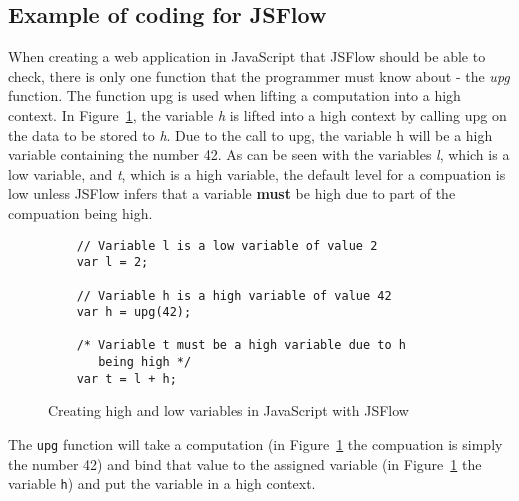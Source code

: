 \subsection{Example of coding for JSFlow}
When creating a web application in JavaScript that JSFlow should be able to check, there is only one function that the programmer must know about - the \emph{upg} function. The function upg is used when lifting a computation into a high context. In Figure~\ref{fig:upg}, the variable \emph{h} is lifted into a high context by calling upg on the data to be stored to \emph{h}. Due to the call to upg, the variable h will be a high variable containing the number 42. As can be seen with the variables \emph{l}, which is a low variable, and \emph{t}, which is a high variable, the default level for a compuation is low unless JSFlow infers that a variable \textbf{must} be high due to part of the compuation being high.

\begin{figure}[h]
  \begin{verbatim}
    // Variable l is a low variable of value 2
    var l = 2;

    // Variable h is a high variable of value 42
    var h = upg(42);

    /* Variable t must be a high variable due to h
       being high */
    var t = l + h;
  \end{verbatim}
  \caption{Creating high and low variables in JavaScript with JSFlow}
  \label{fig:upg}
\end{figure}
The {\tt upg} function will take a computation (in Figure~\ref{fig:upg} the compuation is simply the number 42) and bind that value to the assigned variable (in Figure~\ref{fig:upg} the variable {\tt h}) and put the variable in a high context.

